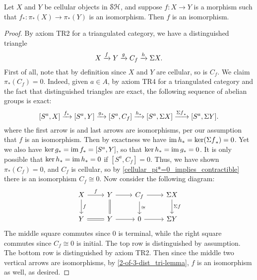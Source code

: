 \documentclass[../main.tex]{subfiles}
\begin{document}
\begin{theorem}\label{whitehead}
	Let $X$ and $Y$ be cellular objects in $\mathcal{SH}$, and suppose $f:X\to Y$ is a morphism such that $f_*:\pi_*(X)\to\pi_*(Y)$ is an isomorphism. Then $f$ is an isomorphism.
\end{theorem}
\begin{proof}
	By axiom TR2 for a triangulated category, we have a distinguished triangle
	\[X\xrightarrow fY\xrightarrow gC_f\xrightarrow h\Sigma X.\]
	First of all, note that by definition since $X$ and $Y$ are cellular, so is $C_f$. We claim $\pi_*(C_f)=0$. Indeed, given $a\in A$, by axiom TR4 for a triangulated category and the fact that distinguished triangles are exact, the following sequence of abelian groups is exact:
	\[[S^a,X]\xrightarrow{f_*}[S^a,Y]\xrightarrow{g_*}[S^a,C_f]\xrightarrow{h_*}[S^a,\Sigma X]\xrightarrow{{\Sigma f}_*}[S^a,\Sigma Y].\]
	where the first arrow is and last arrows are isomorphisms, per our assumption that $f$ is an isomorphism. Then by exactness we have $\operatorname{im} h_*=\ker({\Sigma f}_*)=0$. Yet we also have $\ker g_*=\operatorname{im} f_*=[S^a,Y]$, so that $\ker h_*=\operatorname{im} g_*=0$. It is only possible that $\ker h_*=\operatorname{im} h_*=0$ if $[S^a,C_f]=0$. Thus, we have shown $\pi_*(C_f)=0$, and $C_f$ is cellular, so by \autoref{cellular_pi*=0_implies_contractible} there is an isomorphism $C_f\cong 0$. Now consider the following diagram:
	\[\begin{tikzcd}
		X & {Y } & {C_f} & {\Sigma X} \\
		Y & Y & 0 & {\Sigma Y}
		\arrow["f", from=1-1, to=2-1]
		\arrow[Rightarrow, no head, from=2-1, to=2-2]
		\arrow["f", from=1-1, to=1-2]
		\arrow[Rightarrow, no head, from=1-2, to=2-2]
		\arrow[from=2-2, to=2-3]
		\arrow[from=1-2, to=1-3]
		\arrow[from=1-3, to=1-4]
		\arrow["{\Sigma f}", from=1-4, to=2-4]
		\arrow[from=2-3, to=2-4]
		\arrow["\cong", from=1-3, to=2-3]
	\end{tikzcd}\]
	The middle square commutes since $0$ is terminal, while the right square commutes since $C_f\cong0$ is initial. The top row is distinguished by assumption. The bottom row is distinguished by axiom TR2. Then since the middle two vertical arrows are isomorphisms, by \autoref{2-of-3-dist_tri-lemma}, $f$ is an isomorphism as well, as desired.
\end{proof}
\end{document}
